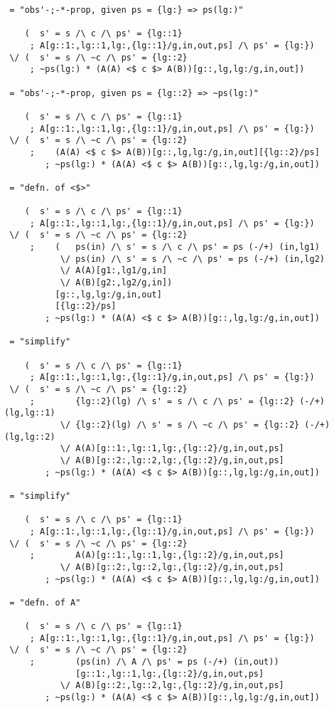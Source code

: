 \begin{verbatim}
 = "obs'-;-*-prop, given ps = {lg:} => ps(lg:)"

    (  s' = s /\ c /\ ps' = {lg::1}
     ; A[g::1:,lg::1,lg:,{lg::1}/g,in,out,ps] /\ ps' = {lg:})
 \/ (  s' = s /\ ~c /\ ps' = {lg::2}
     ; ~ps(lg:) * (A(A) <$ c $> A(B))[g::,lg,lg:/g,in,out])

 = "obs'-;-*-prop, given ps = {lg::2} => ~ps(lg:)"

    (  s' = s /\ c /\ ps' = {lg::1}
     ; A[g::1:,lg::1,lg:,{lg::1}/g,in,out,ps] /\ ps' = {lg:})
 \/ (  s' = s /\ ~c /\ ps' = {lg::2}
     ;    (A(A) <$ c $> A(B))[g::,lg,lg:/g,in,out][{lg::2}/ps]
        ; ~ps(lg:) * (A(A) <$ c $> A(B))[g::,lg,lg:/g,in,out])

 = "defn. of <$>"

    (  s' = s /\ c /\ ps' = {lg::1}
     ; A[g::1:,lg::1,lg:,{lg::1}/g,in,out,ps] /\ ps' = {lg:})
 \/ (  s' = s /\ ~c /\ ps' = {lg::2}
     ;    (   ps(in) /\ s' = s /\ c /\ ps' = ps (-/+) (in,lg1)
           \/ ps(in) /\ s' = s /\ ~c /\ ps' = ps (-/+) (in,lg2)
           \/ A(A)[g1:,lg1/g,in]
           \/ A(B)[g2:,lg2/g,in])
          [g::,lg,lg:/g,in,out]
          [{lg::2}/ps]
        ; ~ps(lg:) * (A(A) <$ c $> A(B))[g::,lg,lg:/g,in,out])

 = "simplify"

    (  s' = s /\ c /\ ps' = {lg::1}
     ; A[g::1:,lg::1,lg:,{lg::1}/g,in,out,ps] /\ ps' = {lg:})
 \/ (  s' = s /\ ~c /\ ps' = {lg::2}
     ;        {lg::2}(lg) /\ s' = s /\ c /\ ps' = {lg::2} (-/+) (lg,lg::1)
           \/ {lg::2}(lg) /\ s' = s /\ ~c /\ ps' = {lg::2} (-/+) (lg,lg::2)
           \/ A(A)[g::1:,lg::1,lg:,{lg::2}/g,in,out,ps]
           \/ A(B)[g::2:,lg::2,lg:,{lg::2}/g,in,out,ps]
        ; ~ps(lg:) * (A(A) <$ c $> A(B))[g::,lg,lg:/g,in,out])

 = "simplify"

    (  s' = s /\ c /\ ps' = {lg::1}
     ; A[g::1:,lg::1,lg:,{lg::1}/g,in,out,ps] /\ ps' = {lg:})
 \/ (  s' = s /\ ~c /\ ps' = {lg::2}
     ;        A(A)[g::1:,lg::1,lg:,{lg::2}/g,in,out,ps]
           \/ A(B)[g::2:,lg::2,lg:,{lg::2}/g,in,out,ps]
        ; ~ps(lg:) * (A(A) <$ c $> A(B))[g::,lg,lg:/g,in,out])

 = "defn. of A"

    (  s' = s /\ c /\ ps' = {lg::1}
     ; A[g::1:,lg::1,lg:,{lg::1}/g,in,out,ps] /\ ps' = {lg:})
 \/ (  s' = s /\ ~c /\ ps' = {lg::2}
     ;        (ps(in) /\ A /\ ps' = ps (-/+) (in,out))
              [g::1:,lg::1,lg:,{lg::2}/g,in,out,ps]
           \/ A(B)[g::2:,lg::2,lg:,{lg::2}/g,in,out,ps]
        ; ~ps(lg:) * (A(A) <$ c $> A(B))[g::,lg,lg:/g,in,out])


\end{verbatim}

